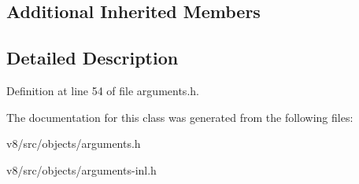 \subsection*{Additional Inherited Members}


\subsection{Detailed Description}


Definition at line 54 of file arguments.\+h.



The documentation for this class was generated from the following files\+:\begin{DoxyCompactItemize}
\item 
v8/src/objects/arguments.\+h\item 
v8/src/objects/arguments-\/inl.\+h\end{DoxyCompactItemize}
